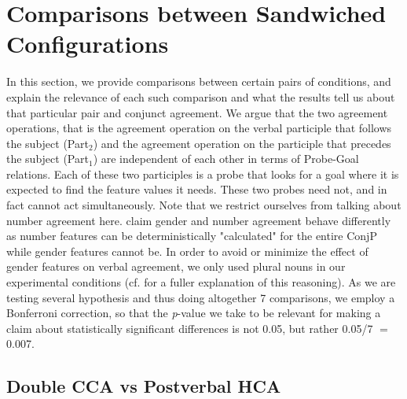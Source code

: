 \documentclass[output=paper
,modfonts
,nonflat]{langsci/langscibook}
\begin{document}
\section{Comparisons between Sandwiched Configurations}

In this section, we provide comparisons between certain pairs of conditions, and explain the relevance of each such comparison and what the results tell us about that particular pair and conjunct agreement. We argue that the two agreement operations, that is the agreement operation on the verbal participle that follows the subject (Part$_2$) and the agreement operation on the participle that precedes the subject (Part$_1$) are independent of each other in terms of Probe-Goal relations. Each of these two participles is a probe that looks for a goal where it is expected to find the feature values it needs. These two probes need not, and in fact cannot act simultaneously. Note that we restrict ourselves from talking about number agreement here. \cite{marusicnevinsbadecker:15} claim gender and number agreement behave differently as number features can be deterministically "calculated" for the entire ConjP while gender features cannot be. In order to avoid or minimize the effect of gender features on verbal agreement, we only used plural nouns in our experimental conditions (cf. \citealt{marusicnevinsbadecker:15} for a fuller explanation of this reasoning). As we are testing several hypothesis and thus doing altogether 7 comparisons, we employ a Bonferroni correction, so that the \textsl{p}-value we take to be relevant for making a claim about statistically significant differences is not 0.05, but rather 0.05/7 $=$ 0.007.

\subsection{Double CCA vs Postverbal HCA}
\end{document}
